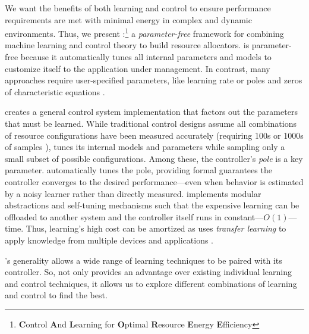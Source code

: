 We want the benefits of both learning and control to ensure
performance requirements are met with minimal energy in complex and
dynamic environments.  Thus, we present
\SYSTEM{}:\footnote{\textbf{C}ontrol \textbf{A}nd \textbf{L}earning
  for \textbf{O}ptimal \textbf{R}esource \textbf{E}nergy
  \textbf{E}fficiency} a \emph{parameter-free} framework for combining
machine learning and control theory to build resource allocators.
\SYSTEM{} is parameter-free because it automatically tunes all
internal parameters and models to customize itself to the application
under management.  In contrast, many approaches require user-specified
parameters, like learning rate \cite{dubach2010,Tokic2010} or poles
and zeros of characteristic equations \cite{ControlWare,POET}.

\SYSTEM{} creates a general control system implementation that factors
out the parameters that must be learned.  While traditional control
designs assume all combinations of resource configurations have been
measured accurately (requiring 100s or 1000s of samples
\cite{sysid,FSE2015}), \SYSTEM{} tunes its internal models and
parameters while sampling only a small subset of possible
configurations.  Among these, the controller's \emph{pole} is a key
parameter.  \SYSTEM{} automatically tunes the pole, providing formal
guarantees the controller converges to the desired performance---even
when behavior is estimated by a noisy learner rather than directly
measured.  \SYSTEM{} implements modular abstractions and self-tuning
mechanisms such that the expensive learning can be offloaded to
another system and the controller itself runs in
constant---$O(1)$---time.  Thus, learning's high cost can be amortized
as \SYSTEM{} uses \emph{transfer learning} to apply knowledge from
multiple devices and applications \cite{pan2010survey}.


\SYSTEM{}'s generality allows a wide range of learning techniques to
be paired with its controller.  So, \SYSTEM{} not only provides an
advantage over existing individual learning and control techniques, it
allows us to explore different combinations of learning and control to
find the best.

